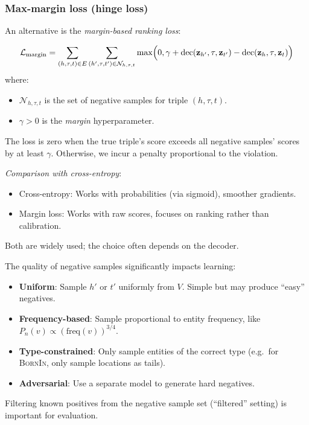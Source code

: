 \begin{notechapter}
\subsubsection*{Max-margin loss (hinge loss)}

An alternative is the \emph{margin-based ranking loss}:

\begin{definition}
\begin{equation}
\mathcal{L}_{\text{margin}} = \sum_{(h,\tau,t) \in E} \sum_{(h',\tau,t') \in \mathcal{N}_{h,\tau,t}} \max\Bigl(0, \gamma + \text{dec}(\mathbf{z}_{h'}, \tau, \mathbf{z}_{t'}) - \text{dec}(\mathbf{z}_h, \tau, \mathbf{z}_t)\Bigr)
\end{equation}
where:
\begin{itemize}
    \item $\mathcal{N}_{h,\tau,t}$ is the set of negative samples for triple $(h, \tau, t)$.
    \item $\gamma > 0$ is the \emph{margin} hyperparameter.
\end{itemize}
\end{definition}

\begin{intuition}
The loss is zero when the true triple's score exceeds all negative samples' scores by at least $\gamma$. Otherwise, we incur a penalty proportional to the violation.

\emph{Comparison with cross-entropy}:
\begin{itemize}
    \item Cross-entropy: Works with probabilities (via sigmoid), smoother gradients.
    \item Margin loss: Works with raw scores, focuses on ranking rather than calibration.
\end{itemize}
Both are widely used; the choice often depends on the decoder.
\end{intuition}

\begin{remark}
The quality of negative samples significantly impacts learning:
\begin{itemize}
    \item \textbf{Uniform}: Sample $h'$ or $t'$ uniformly from $V$. Simple but may produce ``easy'' negatives.
    \item \textbf{Frequency-based}: Sample proportional to entity frequency, like $P_n(v) \propto (\text{freq}(v))^{3/4}$.
    \item \textbf{Type-constrained}: Only sample entities of the correct type (e.g.\ for \textsc{BornIn}, only sample locations as tails).
    \item \textbf{Adversarial}: Use a separate model to generate hard negatives.
\end{itemize}
Filtering known positives from the negative sample set (``filtered'' setting) is important for evaluation.
\end{remark}



\end{notechapter}
